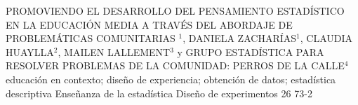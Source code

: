 \A
{PROMOVIENDO EL DESARROLLO DEL PENSAMIENTO ESTADÍSTICO EN LA EDUCACIÓN MEDIA A TRAVÉS DEL ABORDAJE DE PROBLEMÁTICAS COMUNITARIAS}
{$^1$, DANIELA ZACHARÍAS$^1$, CLAUDIA HUAYLLA$^2$, MAILEN LALLEMENT$^3$ y GRUPO ESTADÍSTICA PARA RESOLVER PROBLEMAS DE LA COMUNIDAD: PERROS DE LA CALLE$^4$}
{
\\}
{educación en contexto; diseño de experiencia; obtención de datos; estadística descriptiva} 
 {Enseñanza de la estadística} 
 {Diseño de experimentos} 
 {26} 
 {73-2}
